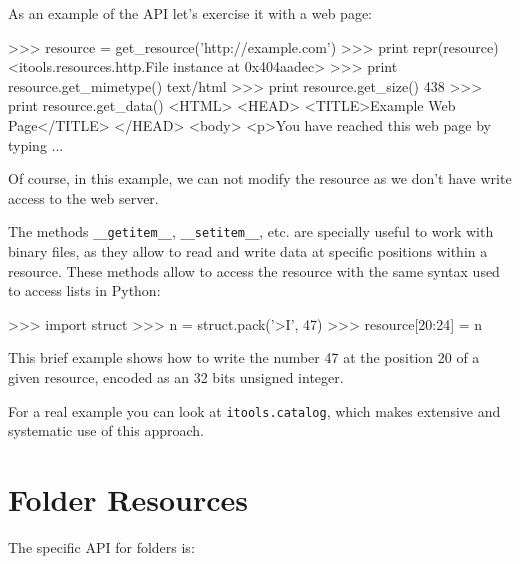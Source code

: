As an example of the API let's exercise it with a web page:

\begin{code}
    >>> resource = get_resource('http://example.com')
    >>> print repr(resource)
    <itools.resources.http.File instance at 0x404aadec>
    >>> print resource.get_mimetype()
    text/html
    >>> print resource.get_size()
    438
    >>> print resource.get_data()
    <HTML>
    <HEAD>
      <TITLE>Example Web Page</TITLE>
    </HEAD> 
    <body>  
    <p>You have reached this web page by typing
    ...
\end{code}

Of course, in this example, we can not modify the resource as we don't have
write access to the web server.

The methods {\tt \_\_getitem\_\_}, {\tt \_\_setitem\_\_}, etc. are specially
useful to work with binary files, as they allow to read and write data at
specific positions within a resource. These methods allow to access the
resource with the same syntax used to access lists in Python:

\begin{code}
    >>> import struct
    >>> n = struct.pack('>I', 47)
    >>> resource[20:24] = n
\end{code}

This brief example shows how to write the number 47 at the position 20 of
a given resource, encoded as an 32 bits unsigned integer.

For a real example you can look at {\tt itools.catalog}, which makes
extensive and systematic use of this approach.


\section{Folder Resources}

The specific API for folders is:

